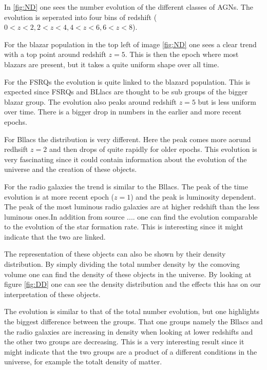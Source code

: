 \documentclass{article}
\begin{document}
In \ref{fig:ND} one sees the number evolution of the different classes of AGNs. The evolution is seperated into four bins of redshift ($0<z<2,2<z<4,4<z<6,6<z<8$).

For the blazar population in the top left of image \ref{fig:ND} one sees a clear trend with a top point around redshift $z=5$. 
This is then the epoch where most blazars are present, but it takes a quite uniform shape over all time.


For the FSRQs the evolution is quite linked to the blazard population. This is expected since FSRQs and BLlacs are thought to be 
sub groups of the bigger blazar group. The evolution also peaks around redshift $z=5$ but is less uniform over time. There is a bigger drop 
in numbers in the earlier and more recent epochs. 

For Bllacs the distribution is very different. Here the peak comes more aorund redhsift $z=2$ and then drops of quite rapidly for older epochs.
This evolution is very fascinating since it could contain information about the evolution of the universe and the creation of these 
objects. 

For the radio galaxies the trend is similar to the Bllacs. The peak of the time evolution is at more recent epoch ($z=1$) and the peak is 
luminosity dependent. The peak of the most luminous radio galaxies are at higher redshift than the less luminous ones.In addition from source .... one can find
the evolution comparable to the evolution of the star formation rate. This is interesting since it might indicate that the two are linked.


The representation of these objects can also be shown by their density distribution. By simply dividing the total number density by the comoving volume one can
find the density of these objects in the universe. By looking at figure \ref{fig:DD} one can see the density distribution and the effects this has on our interpretation of these objects.

The evolution is similar to that of the total number evolution, but one highlights the biggest difference between the groups. That one groups namely the Bllacs and the radio galaxies
are increasing in density when looking at lower redshifts and the other two groups are decreasing. This is a very interesting result since it might indicate that the two groups are 
a product of a different conditions in the universe, for example the totalt density of matter. 
\end{document}
